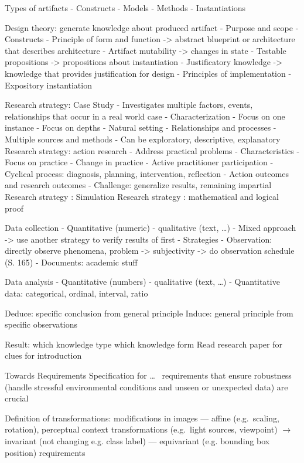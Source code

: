 Types of artifacts
- Constructs
- Models
- Methods
- Instantiations

Design theory: generate knowledge about produced artifact
- Purpose and scope
- Constructs
- Principle of form and function -> abstract blueprint or architecture that describes architecture
- Artifact mutability -> changes in state
- Testable propositions -> propositions about instantiation
- Justificatory knowledge -> knowledge that provides justification for design
- Principles of implementation
- Expository instantiation

Research strategy: Case Study
- Investigates multiple factors, events, relationships that occur in a real world case
- Characterization
    - Focus on one instance
    - Focus on depths
    - Natural setting
    - Relationships and processes
    - Multiple sources and methods
- Can be exploratory, descriptive, explanatory
Research strategy: action research
- Address practical problems
- Characteristics
    - Focus on practice
    - Change in practice
    - Active practitioner participation
    - Cyclical process: diagnosis, planning, intervention, reflection
    - Action outcomes and research outcomes
- Challenge: generalize results, remaining impartial
Research strategy	: Simulation
Research strategy	: mathematical and logical proof

Data collection
- Quantitative (numeric) - qualitative (text, …)
- Mixed approach -> use another strategy to verify results of first
- Strategies
    - Observation: directly observe phenomena, problem -> subjectivity -> do observation schedule (S. 165)
    - Documents: academic stuff

Data analysis
- Quantitative (numbers) - qualitative (text, …)
- Quantitative data: categorical, ordinal, interval, ratio

Deduce: specific conclusion from general principle
Induce: general principle from specific observations


Result: which knowledge type which knowledge form
Read research paper for clues for introduction

Towards Requirements Specification for \ldots~\cite{hu_towards_2020}
requirements that ensure robustness (handle stressful environmental conditions and unseen or
unexpected data) are crucial

Definition of transformations: modifications in images
--- affine (e.g.\ scaling, rotation), perceptual context transformations (e.g.\ light sources, viewpoint)
$\rightarrow$ invariant (not changing e.g. class label) --- equivariant (e.g. bounding
                box position) requirements


